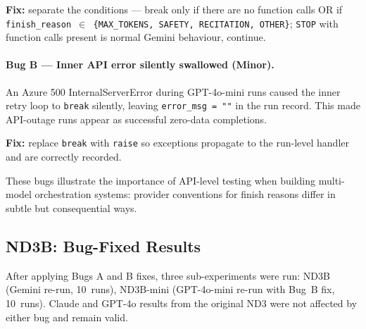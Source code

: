 \textbf{Fix:} separate the conditions --- break only if there are no function calls OR
if \texttt{finish\_reason $\in$ \{MAX\_TOKENS, SAFETY, RECITATION, OTHER\}}; \texttt{STOP}
with function calls present is normal Gemini behaviour, continue.

\paragraph{Bug B --- Inner API error silently swallowed (Minor).}
An Azure 500 InternalServerError during GPT-4o-mini runs caused the inner retry loop to
\texttt{break} silently, leaving \texttt{error\_msg = ""} in the run record.  This made
API-outage runs appear as successful zero-data completions.

\textbf{Fix:} replace \texttt{break} with \texttt{raise} so exceptions propagate to the
run-level handler and are correctly recorded.

These bugs illustrate the importance of API-level testing when building multi-model
orchestration systems: provider conventions for finish reasons differ in subtle but
consequential ways.

\subsection{ND3B: Bug-Fixed Results}
\label{sec:ch4_nd3b}

After applying Bugs A and B fixes, three sub-experiments were run: ND3B (Gemini re-run,
10~runs), ND3B-mini (GPT-4o-mini re-run with Bug~B fix, 10~runs).  Claude and GPT-4o
results from the original ND3 were not affected by either bug and remain valid.

